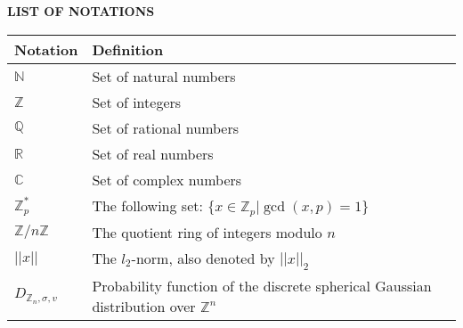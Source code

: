 
\begin{center}
    \textbf{\Large LIST OF NOTATIONS}\\

    \vspace{1cm}   

	\begin{tabular}{ |l|l| } 
		\hline
		Notation                          & Definition                                                                               \\ \hline
		$\mathbb{N}$                      & Set of natural numbers                                                                   \\
		$\mathbb{Z}$                      & Set of integers                                                                          \\
		$\mathbb{Q}$                      & Set of rational numbers                                                                  \\
		$\mathbb{R}$                      & Set of real numbers                                                                      \\
		$\mathbb{C}$                      & Set of complex numbers                                                                   \\
        $\mathbb{Z}_p^{*}$                & The following set: $\{ x \in \mathbb{Z}_p | \gcd(x, p) = 1\}$                            \\
		$\mathbb{Z}/n\mathbb{Z}$          & The quotient ring of integers modulo $n$                                                 \\
		$||x||$                           & The $l_2$-norm, also denoted by $||x||_2$                                                \\
		$D_{\mathbb{Z}_n,\sigma,v}$       & Probability function of the discrete spherical Gaussian distribution over $\mathbb{Z}^n$ \\

\end{tabular}
\end{center}
